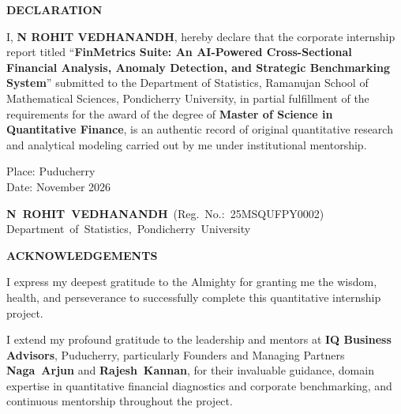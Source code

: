 \documentclass[12pt,oneside]{report}
\begin{document}
\newpage
\thispagestyle{plain}
{}

\begin{center}
    \textbf{\LARGE DECLARATION} \\[0.5cm]
\end{center}

\noindent
I, \textbf{N ROHIT VEDHANANDH}, hereby declare that the corporate internship report titled “\textbf{FinMetrics Suite: An AI-Powered Cross-Sectional Financial Analysis, Anomaly Detection, and Strategic Benchmarking System}” submitted to the Department of Statistics, Ramanujan School of Mathematical Sciences, Pondicherry University, in partial fulfillment of the requirements for the award of the degree of \textbf{Master of Science in Quantitative Finance}, is an authentic record of original quantitative research and analytical modeling carried out by me under institutional mentorship.

\vspace{0.4cm}
\noindent
\begin{minipage}[t]{0.28\textwidth}
    Place: Puducherry \\
    Date: November 2026
\end{minipage}\hfill
\begin{minipage}[t]{0.70\textwidth}
    \raggedleft
    \mbox{\textbf{N ROHIT VEDHANANDH} (Reg. No.: 25MSQUFPY0002)} \\
    \mbox{Department of Statistics, Pondicherry University}
\end{minipage}

\vspace{0.6cm}
\begin{center}
    \textbf{\LARGE ACKNOWLEDGEMENTS} \\[0.4cm]
\end{center}

\noindent
I express my deepest gratitude to the Almighty for granting me the wisdom, health, and perseverance to successfully complete this quantitative internship project.

\vspace{0.25cm}
\noindent
{\sloppy{}
I extend my profound gratitude to the leadership and mentors at \textbf{IQ Business Advisors}, Puducherry, particularly Founders and Managing Partners \mbox{\textbf{Naga Arjun}} and \mbox{\textbf{Rajesh Kannan}}, for their invaluable guidance, domain expertise in quantitative financial diagnostics and corporate benchmarking, and continuous mentorship throughout the project.\par}
\end{document}
